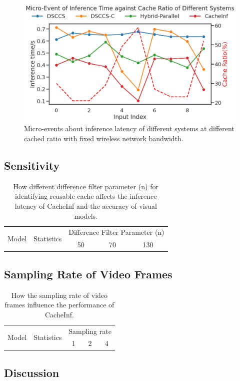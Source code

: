 \begin{figure}[htb]
    \includegraphics[width=0.98\linewidth]{fig/MicroEvent3.png}
    \caption[short]{Micro-events about inference latency of different systems at different cached ratio with fixed wireless network bandwidth.}
\end{figure}

\subsection{Sensitivity}

\begin{table}[htb]
    \begin{tabular}{c|c|c|c|c}
        \toprule
        \multirow[c]{2}{*}{Model} & \multirow[c]{2}{*}{Statistics} & \multicolumn{3}{c}{Difference Filter Parameter (n)} \\
        \cline{3-5}
        & & 50 & 70 & 130 \\
        \midrule
        \bottomrule

    \end{tabular}
    \caption[accuracy]{How different difference filter parameter (n) for identifying reusable cache affects the inference latency of CacheInf and the accuracy of visual models.}
\end{table}

\subsection{Sampling Rate of Video Frames}

\begin{table}[htb]
    \begin{tabular}{c|c|c|c|c}
        \toprule
        \multirow[c]{2}{*}{Model} & \multirow[c]{2}{*}{Statistics} & \multicolumn{3}{|c}{Sampling rate} \\
        \cline{3-5}
        & & 1 & 2 & 4 \\
        \midrule
        \bottomrule

    \end{tabular}
    \caption[sample rates]{How the sampling rate of video frames influence the performance of CacheInf.}
\end{table}

\subsection{Discussion}